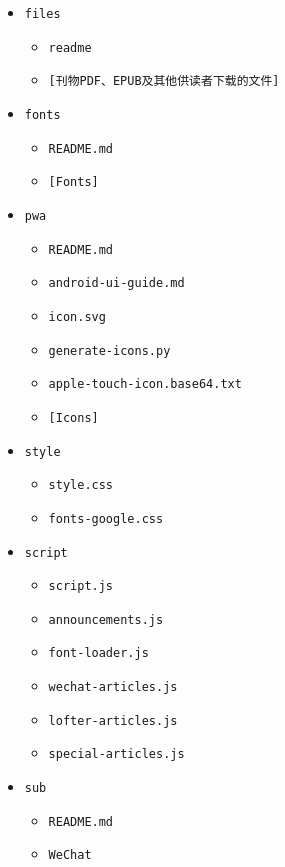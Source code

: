 \documentclass[fontset=fandol]{ctexrep}
\begin{document}
\begin{itemize}
\begin{itemize}
		\begin{itemize}
			\item{\verb|cover-1st.png（等刊物期数封面）|}
		\end{itemize}
		\item{\verb|files|}
		\begin{itemize}
			\item{\verb|readme|}
			\item{\verb|[刊物PDF、EPUB及其他供读者下载的文件]|}
		\end{itemize}
		\item{\verb|fonts|}
		\begin{itemize}
			\item{\verb|README.md|}
			\item{\verb|[Fonts]|}
		\end{itemize}
		\item{\verb|pwa|}
		\begin{itemize}
			\item{\verb|README.md|}
			\item{\verb|android-ui-guide.md|}
			\item{\verb|icon.svg|}
			\item{\verb|generate-icons.py|}
			\item{\verb|apple-touch-icon.base64.txt|}
			\item{\verb|[Icons]|}
		\end{itemize}
		\item{\verb|style|}
		\begin{itemize}
			\item{\verb|style.css|}
			\item{\verb|fonts-google.css|}
		\end{itemize}
		\item{\verb|script|}
		\begin{itemize}
			\item{\verb|script.js|}
			\item{\verb|announcements.js|}
			\item{\verb|font-loader.js|}
			\item{\verb|wechat-articles.js|}
			\item{\verb|lofter-articles.js|}
			\item{\verb|special-articles.js|}
		\end{itemize}
		\item{\verb|sub|}
		\begin{itemize}
			\item{\verb|README.md|}
			\item{\verb|WeChat|}

\end{itemize}
\end{itemize}
\end{itemize}
\end{document}
